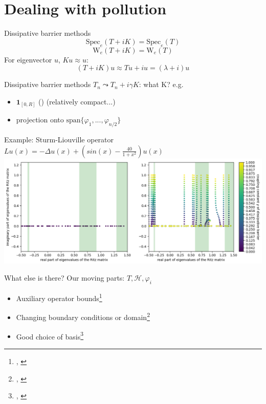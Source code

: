 \documentclass[14pt]{beamer}
\newcommand{\Spec}{\mathrm{Spec}} %
\newcommand{\Num}{\mathrm{W}} %
\newcommand{\1}{\mathbf{1}}
\begin{document}
\section{Dealing with pollution}
\begin{frame}{Dissipative barrier methods}
  $$\Spec_e(T + iK) = \Spec_e(T)$$
  $$\Num_e(T + iK) = \Num_e(T)$$
  For eigenvector $u$, $Ku \approx u$:
  $$(T + iK)u \approx Tu + iu = (\lambda + i)u$$
\end{frame}

\begin{frame}{Dissipative barrier methods}
  $T_n \leadsto T_n + i\gamma K$: what K? e.g.
  \begin{itemize}
    \item $\1_{[0, R]}$ (\textcite{stepanenko2022spectral}) (relatively compact...)
    \item projection onto $\mathrm{span}\{\varphi_1, ..., \varphi_{n/2}\}$
  \end{itemize}
\end{frame}

\begin{frame}{Example: Sturm-Liouville operator}
  \centering
  $Lu(x) = -\Delta u(x) + (sin(x) - \frac{40}{1+x^2})u(x)$
  \includegraphics[width=\textwidth]{aceto-coup-presentation}
\end{frame}

\begin{frame}{What else is there?}
  Our moving parts: $T,\mathcal{H}, \varphi_i$
  \begin{itemize}
    \item Auxiliary operator bounds\footnote{\textcite{levitin2002spectral}, \textcite{davies2003spectral}}
    \item Changing boundary conditions or domain\footnote{\textcite{cances2012periodic}, \textcite{aceto2006numerical}}
    \item Good choice of basis\footnote{\textcite{lewin2010spectral}, \textcite{boffi1999problem}}
  \end{itemize}
\end{frame}
\end{document}
